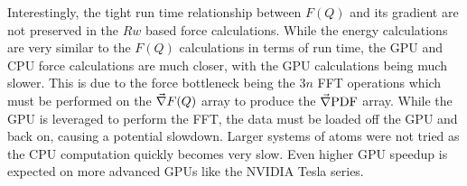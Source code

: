 Interestingly, the tight run time relationship between $F(Q)$ and its gradient are not preserved in the $Rw$ based force calculations.
While the energy calculations are very similar to the $F(Q)$ calculations in terms of run time, the GPU and CPU force calculations are much closer, with the GPU calculations being much slower.
This is due to the force bottleneck being the $3n$ FFT operations which must be performed on the $\vec{\nabla} F(Q)$ array to produce the $\vec{\nabla} \text{PDF}$ array.
While the GPU is leveraged to perform the FFT, the data must be loaded off the GPU and back on, causing a potential slowdown.
Larger systems of atoms were not tried as the CPU computation quickly becomes very slow.
Even higher GPU  speedup is expected on more advanced GPUs like the NVIDIA Tesla series.